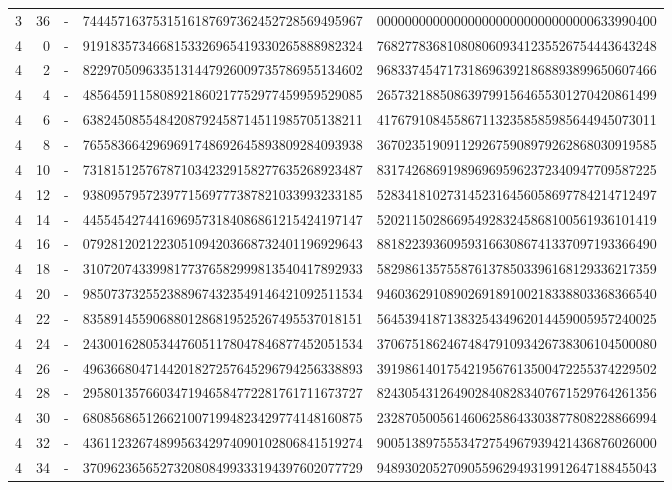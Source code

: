 \begin{longtable}{rrrll}
3 & 36 & - & 7444571637531516187697362452728569495967 & 0000000000000000000000000000000633990400 \\
4 & 0 & - & 9191835734668153326965419330265888982324 & 7682778368108080609341235526754443643248 \\
4 & 2 & - & 8229705096335131447926009735786955134602 & 9683374547173186963921868893899650607466 \\
4 & 4 & - & 4856459115808921860217752977459959529085 & 2657321885086397991564655301270420861499 \\
4 & 6 & - & 6382450855484208792458714511985705138211 & 4176791084558671132358585985644945073011 \\
4 & 8 & - & 7655836642969691748692645893809284093938 & 3670235190911292675908979262868030919585 \\
4 & 10 & - & 7318151257678710342329158277635268923487 & 8317426869198969695962372340947709587225 \\
4 & 12 & - & 9380957957239771569777387821033993233185 & 5283418102731452316456058697784214712497 \\
4 & 14 & - & 4455454274416969573184086861215424197147 & 5202115028669549283245868100561936101419 \\
4 & 16 & - & 0792812021223051094203668732401196929643 & 8818223936095931663086741337097193366490 \\
4 & 18 & - & 3107207433998177376582999813540417892933 & 5829861357558761378503396168129336217359 \\
4 & 20 & - & 9850737325523889674323549146421092511534 & 9460362910890269189100218338803368366540 \\
4 & 22 & - & 8358914559068801286819525267495537018151 & 5645394187138325434962014459005957240025 \\
4 & 24 & - & 2430016280534476051178047846877452051534 & 3706751862467484791093426738306104500080 \\
4 & 26 & - & 4963668047144201827257645296794256338893 & 3919861401754219567613500472255374229502 \\
4 & 28 & - & 2958013576603471946584772281761711673727 & 8243054312649028408283407671529764261356 \\
4 & 30 & - & 6808568651266210071994823429774148160875 & 2328705005614606258643303877808228866994 \\
4 & 32 & - & 4361123267489956342974090102806841519274 & 9005138975553472754967939421436876026000 \\
4 & 34 & - & 3709623656527320808499333194397602077729 & 9489302052709055962949319912647188455043 \\

\end{longtable}
